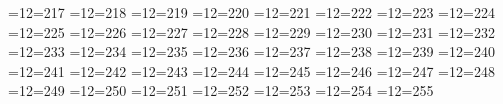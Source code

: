 =12=217
=12=218
=12=219
=12=220
=12=221
=12=222
=12=223
=12=224
=12=225
=12=226
=12=227
=12=228
=12=229
=12=230
=12=231
=12=232
=12=233
=12=234
=12=235
=12=236
=12=237
=12=238
=12=239
=12=240
=12=241
=12=242
=12=243
=12=244
=12=245
=12=246
=12=247
=12=248
=12=249
=12=250
=12=251
=12=252
=12=253
=12=254
=12=255
\endinput

